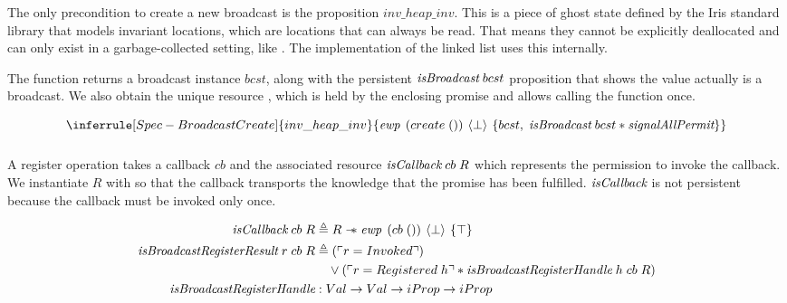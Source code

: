 \subsubsection{}
\label{sec:broadcast-spec-create}

The only precondition to create a new broadcast is the proposition \(inv\_heap\_inv\).
This is a piece of ghost state defined by the Iris standard library that models invariant locations, which are locations that can always be read.
That means they cannot be explicitly deallocated and can only exist in a garbage-collected setting, like \ocf{}.
The implementation of the linked list uses this internally.

The function returns a broadcast instance \(bcst\), along with the persistent \(\emph{isBroadcast}{}\; bcst\) proposition that shows the value actually is a broadcast.
We also obtain the unique resource \gssignal{}, which is held by the enclosing promise and allows calling the  function once.

\[
  \inferrule[Spec-BroadcastCreate]
  {inv\_heap\_inv}
  {\ewp{create\; ()}{\bot}{bcst,\; \gsIsBcst{}\; bcst \ast \gssignal{}}}
\]

\subsubsection{}
\label{sec:broadcast-spec-suspend}

A register operation takes a callback \(cb\) and the associated resource \(\emph{isCallback}{}\; cb\; R\) which represents the permission to invoke the callback.
We instantiate \(R\) with \gspdone{} so that the callback transports the knowledge that the promise has been fulfilled.
\(\emph{isCallback}{}\) is not persistent because the callback must be invoked only once.

\begin{align*}
  \gsIsCb{}\; cb\; R                            & \triangleq R \wand \ewp{cb\; ()}{\bot}{\top}                                                           \\
  \emph{isBroadcastRegisterResult}\; r\; cb\; R & \triangleq (\ulcorner r = Invoked \urcorner)                                                           \\
                                                & \quad \vee (\ulcorner r = Registered\; h \urcorner \ast \emph{isBroadcastRegisterHandle}\; h\; cb\; R) \\
  \emph{isBroadcastRegisterHandle}              & : Val \to Val \to iProp \to iProp
\end{align*}

